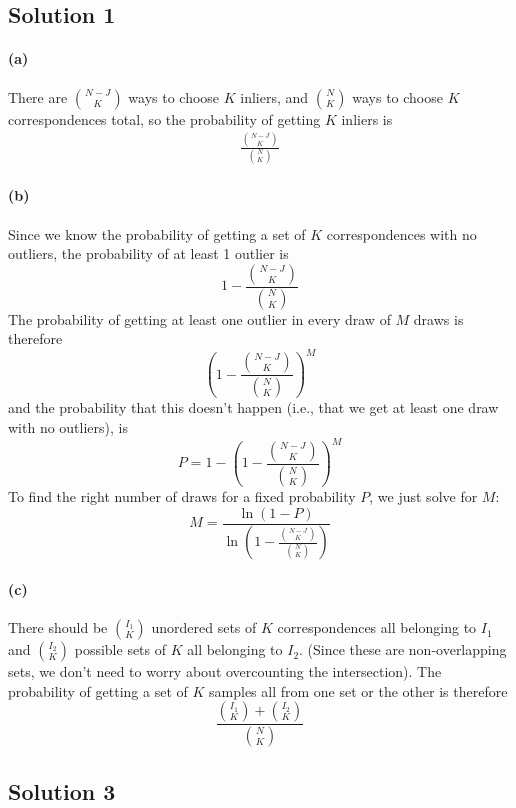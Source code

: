 \documentclass{article}
\newcommand{\solution}[1]{\clearpage \subsection*{Solution #1}}
\newcommand{\spart}[1]{\paragraph{(#1)}}
\begin{document}

\solution{1}

\spart{a} There are $\binom{N-J}{K}$ ways to choose $K$ inliers, and $\binom{N}{K}$ ways to choose $K$ correspondences total, so the probability of getting $K$ inliers is
\begin{align}
\frac{\binom{N-J}{K}}{\binom{N}{K}}
\end{align}

\spart{b} Since we know the probability of getting a set of $K$ correspondences with no outliers, the probability of at least 1 outlier is
\begin{equation}
1 - \frac{\binom{N-J}{K}}{\binom{N}{K}}
\end{equation}
The probability of getting at least one outlier in every draw of $M$ draws is therefore
\begin{equation}
\left(1-\frac{\binom{N-J}{K}}{\binom{N}{K}} \right)^M
\end{equation}
and the probability that this doesn't happen (i.e., that we get at least one draw with no outliers), is 
\begin{equation}
P = 1-\left(1-\frac{\binom{N-J}{K}}{\binom{N}{K}} \right)^M
\end{equation}
To find the right number of draws for a fixed probability $P$, we just solve for $M$:
\begin{equation}
M = \frac{ \ln(1-P) }{ \ln\left(1-\frac{\binom{N-J}{K}}{\binom{N}{K}} \right) }
\end{equation}

\spart{c} There should be $\binom{I_1}{K}$ unordered sets of $K$ correspondences all belonging to $I_1$ and $\binom{I_2}{K}$ possible sets of $K$ all belonging to $I_2$. (Since these are non-overlapping sets, we don't need to worry about overcounting the intersection). The probability of getting a set of $K$ samples all from one set or the other is therefore
\begin{equation}
\frac{ \binom{I_1}{K} + \binom{I_2}{K} }{ \binom{N}{K} }
\end{equation}

\solution{3}
\end{document}
